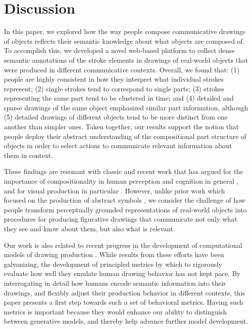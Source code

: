 \documentclass[10pt,letterpaper]{article}
\newcommand{\kushin}[1]{{\color{orange}{[kushin: #1]}}}
\begin{document}
\section{Discussion}

In this paper, we explored how the way people compose communicative drawings of objects reflects their semantic knowledge about what objects are composed of. 
To accomplish this, we developed a novel web-based platform to collect dense semantic annotations of the stroke elements in drawings of real-world objects that were produced in different communicative contexts. 
Overall, we found that: (1) people are highly consistent in how they interpret what individual strokes represent; (2) single strokes tend to correspond to single parts; (3) strokes representing the same part tend to be clustered in time; and (4) detailed and sparse drawings of the same object emphasized similar part information, although (5) detailed drawings of different objects tend to be more distinct from one another than simpler ones. 
Taken together, our results support the notion that people deploy their abstract understanding of the compositional part structure of objects in order to select actions to communicate relevant information about them in context.  

These findings are resonant with classic and recent work that has argued for the importance of compositionality in human perception and cognition in general \cite{biederman1987recognition, battaglia2018relational,lake2017building}, and for visual production in particular \cite{lake2015human}. 
However, unlike prior work which focused on the production of abstract symbols \cite{lake2015human}, we consider the challenge of how people transform perceptually grounded representations of real-world objects into procedures for producing figurative drawings that communicate not only what they see and know about them, but also what is relevant. 

Our work is also related to recent progress in the development of computational models of drawing production \cite{ha2017neural,li2019photo}. 
While results from these efforts have been galvanizing, the development of principled metrics by which to rigorously evaluate how well they emulate human drawing behavior has not kept pace. 
By interrogating in detail how humans encode semantic information into their drawings, and flexibly adjust their production behavior in different contexts, this paper presents a first step towards such a set of behavioral metrics.
Having such metrics is important because they would enhance our ability to distinguish between generative models, and thereby help advance further model development. 
\end{document}
